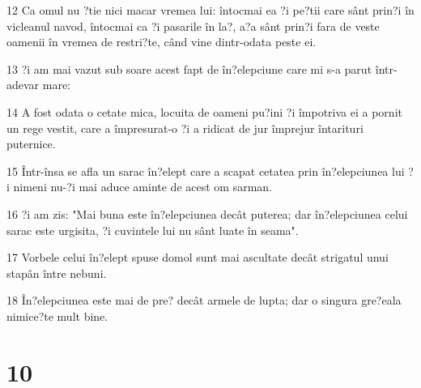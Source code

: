 \par 12 Ca omul nu ?tie nici macar vremea lui: întocmai ea ?i pe?tii care sânt prin?i în vicleanul navod, întocmai ca ?i pasarile în la?, a?a sânt prin?i fara de veste oamenii în vremea de restri?te, când vine dintr-odata peste ei.
\par 13 ?i am mai vazut sub soare acest fapt de în?elepciune care mi s-a parut într-adevar mare:
\par 14 A fost odata o cetate mica, locuita de oameni pu?ini ?i împotriva ei a pornit un rege vestit, care a împresurat-o ?i a ridicat de jur împrejur întarituri puternice.
\par 15 Într-însa se afla un sarac în?elept care a scapat cetatea prin în?elepciunea lui ?i nimeni nu-?i mai aduce aminte de acest om sarman.
\par 16 ?i am zis: "Mai buna este în?elepciunea decât puterea; dar în?elepciunea celui sarac este urgisita, ?i cuvintele lui nu sânt luate în seama".
\par 17 Vorbele celui în?elept spuse domol sunt mai ascultate decât strigatul unui stapân între nebuni.
\par 18 În?elepciunea este mai de pre? decât armele de lupta; dar o singura gre?eala nimice?te mult bine.

\chapter{10}

